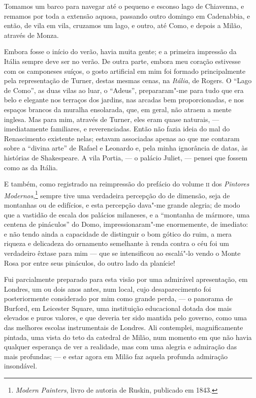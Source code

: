 Tomamos um barco para navegar até o pequeno e esconso lago de Chiavenna,
e remamos por toda a extensão aquosa, passando outro domingo em
Cadenabbia, e então, de vila em vila, cruzamos um lago, e outro, até
Como, e depois a Milão, através de Monza.

Embora fosse o início do verão, havia muita gente; e a primeira
impressão da Itália sempre deve ser no verão. De outra parte, embora meu
coração estivesse com os camponeses suíços, o gosto artificial em mim
foi formado principalmente pela representação de Turner, destas mesmas
cenas, na \textit{Itália}, de Rogers. O ``Lago de Como'', as duas vilas ao
luar, o ``Adeus'', prepararam"-me para tudo que era belo e elegante nos
terraços dos jardins, nas arcadas bem proporcionadas, e nos espaços
brancos da muralha ensolarada, que, em geral, não atraem a mente
inglesa. Mas para mim, através de Turner, eles eram quase naturais, ---
imediatamente familiares, e reverenciadas. Então não fazia ideia do mal
do Renascimento existente nelas; estavam associadas apenas ao que me
contaram sobre a ``divina arte'' de Rafael e Leonardo e, pela minha
ignorância de datas, às histórias de Shakespeare. A vila Portia, --- o
palácio Juliet, --- pensei que fossem como as da Itália.

E também, como registrado na reimpressão do prefácio do volume \textsc{ii} dos
\textit{Pintores Modernos},\footnote{\textit{Modern Painters}, livro de
  autoria de Ruskin, publicado em 1843.} sempre tive uma
verdadeira percepção do de dimensão, seja de montanhas ou de edifícios,
e esta percepção dava"-me grande alegria; de modo que a vastidão de
escala dos palácios milaneses, e a ``montanha de mármore, uma centena de
pináculos'' do Domo, impressionaram"-me enormemente, de imediato: e não
tendo ainda a capacidade de distinguir o bom gótico do ruim, a mera
riqueza e delicadeza do ornamento semelhante à renda contra o céu foi um
verdadeiro êxtase para mim --- que se intensificou ao escalá"-lo vendo o
Monte Rosa por entre seus pináculos, do outro lado da planície!

Fui parcialmente preparado para esta visão por uma admirável
apresentação, em Londres, um ou dois anos antes, num local, cujo
desaparecimento foi posteriormente considerado por mim como grande
perda, --- o panorama de Burford, em Leicester Square, uma instituição
educacional dotada dos mais elevados e puros valores, e que deveria ter
sido mantida pelo governo, como uma das melhores escolas instrumentais
de Londres. Ali contemplei, magnificamente pintada, uma vista do teto da
catedral de Milão, num momento em que não havia qualquer esperança de
ver a realidade, mas com uma alegria e admiração das mais profundas; ---
e estar agora em Milão faz aquela profunda admiração insondável.

